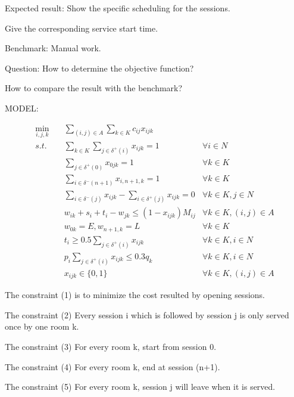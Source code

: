 Expected result:
Show the specific scheduling for the sessions.

Give the corresponding service start time.


Benchmark: Manual work.

Question: How to determine the objective function?


          How to compare the result with the benchmark?


MODEL:

\begin{align}
\min_{i,j,k} \quad & \sum_{(i,j) \in A} \sum_{k \in K} c_{ij} x_{ijk} \\
s.t. \quad  & \sum_{k \in K} \sum_{j \in \delta^+ (i)} x_{ijk} =1 & \forall i \in N  \\
& \sum_{j \in \delta^+ (0)} x_{0jk} =1 & \forall k \in K \\
& \sum_{i \in \delta^- (n+1)} x_{i,n+1,k} =1 & \forall k \in K \\
& \sum_{i \in \delta^- (j)} x_{ijk} - \sum_{i \in \delta^+ (j)} x_{ijk} = 0  & \forall k \in K, j \in N \\
& w_{ik} + s_i + t_{i} - w_{jk} \leq (1-x_{ijk}) M_{ij} & \forall k \in K, (i,j) \in A \\
& w_{0k}=E, w_{n+1,k}=L  & \forall k \in K \\
& t_{i} \geq 0.5 \sum_{j \in \delta^+(i)} x_{ijk}  & \forall k \in K, i \in N  \\
& p_i \sum_{j \in \delta^+ (i)} x_{ijk} \leq 0.3 q_k & \forall k \in K, i \in N \\
& x_{ijk} \in \{0,1\} & \forall k \in K, (i,j) \in A
\end{align}

The constraint (1) is to minimize the cost resulted by opening sessions.

The constraint (2) Every session i which is followed by session j is only served once by one room k.

The constraint (3) For every room k, start from session 0.

The constraint (4) For every room k, end at session (n+1).

The constraint (5) For every room k, session j will leave when it is served.

